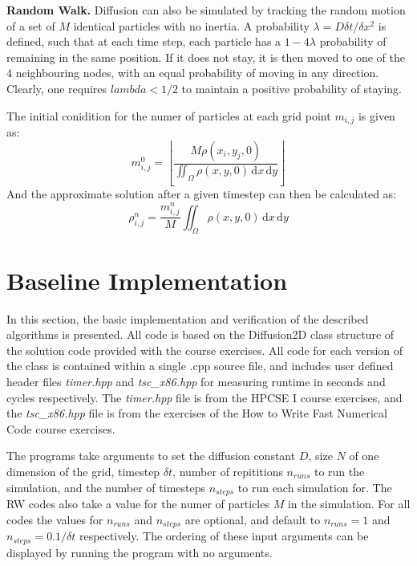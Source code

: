 \documentclass[letterpaper]{article}
\newcommand{\mypar}[1]{{\bf #1.}}
\begin{document}
\mypar{Random Walk}
Diffusion can also be simulated by tracking the random motion of a set of $M$ identical particles with no inertia. A probability $\lambda=D\delta t/\delta x^2$ is defined, such that at each time step, each particle has a $1-4\lambda$ probability of remaining in the same position. If it does not stay, it is then moved to one of the 4 neighbouring nodes, with an equal probability of moving in any direction. Clearly, one requires $lambda<1/2$ to maintain a positive probability of staying.

The initial conidition for the numer of particles at each grid point $m_{i,j}$ is given as:
\begin{equation}
m_{i,j}^0=\left \lfloor{\frac{M\rho(x_i,y_j,0)}{\iint_\Omega \rho(x,y,0) \,\mathrm{d}x\,\mathrm{d}y}}\right \rfloor 
\end{equation}
And the approximate solution after a given timestep can then be calculated as:
\begin{equation}
\rho_{i,j}^n=\frac{m_{i,j}^n}{M}\iint_\Omega \rho(x,y,0)  \,\mathrm{d}x\,\mathrm{d}y
\end{equation}

\section{Baseline Implementation}\label{sec:baseline}

In this section, the basic implementation and verification of the described algorithms is presented. All code is based on the Diffusion2D class structure of the solution code provided with the course exercises. All code for each version of the class is contained within a single .cpp source file, and includes user defined header files \textit{timer.hpp} and \textit{tsc\_x86.hpp} for measuring runtime in seconds and cycles respectively. The \textit{timer.hpp} file is from the HPCSE I course exercises, and the \textit{tsc\_x86.hpp} file is from the exercises of the How to Write Fast Numerical Code course exercises.

The programs take arguments to set the diffusion constant $D$, size $N$ of one dimension of the grid, timestep $\delta t$, number of repititions $n_{runs}$ to run the simulation, and the number of timesteps $n_{steps}$ to run each simulation for. The RW codes also take a value for the numer of particles $M$ in the simulation. For all codes the values for $n_{runs}$ and $n_{steps}$ are optional, and default to $n_{runs}=1$ and $n_{steps}=0.1/\delta t$ respectively. The ordering of these input arguments can be displayed by running the program with no arguments.
\end{document}
